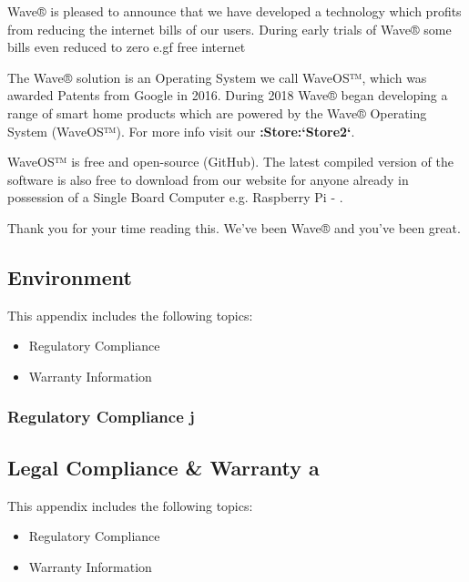 \documentclass[letterpaper,10pt,openany,oneside,english]{sphinxmanual}
\begin{document}
Wave® is pleased to announce that we have developed a technology which profits from reducing the internet bills of our users. During early trials of Wave® some bills even reduced to zero e.gf free internet

The Wave® solution is an Operating System we call WaveOS™, which was awarded Patents from Google in 2016. During 2018 Wave® began developing a range of smart home products which are powered by the Wave® Operating System (WaveOS™). For more info visit our {\color{red}\bfseries{}:Store:{}`Store2{}`}.

WaveOS™ is free and open-source (GitHub). The latest compiled version of the software is also free to download from our website for anyone already in possession of a Single Board Computer e.g. Raspberry Pi - .

Thank you for your time reading this.
We’ve been Wave® and you’ve been great.


\subsection{Environment}
\label{\detokenize{environment:environment}}\label{\detokenize{environment::doc}}
This appendix includes the following topics:
\begin{itemize}
\item {} 
Regulatory Compliance

\item {} 
Warranty Information

\end{itemize}


\subsubsection{Regulatory Compliance j}
\label{\detokenize{environment:regulatory-compliance-j}}

\subsection{Legal Compliance \& Warranty a}
\label{\detokenize{why:legal-compliance-warranty-a}}\label{\detokenize{why::doc}}
This appendix includes the following topics:
\begin{itemize}
\item {} 
Regulatory Compliance

\item {} 
Warranty Information

\end{itemize}
\end{document}
